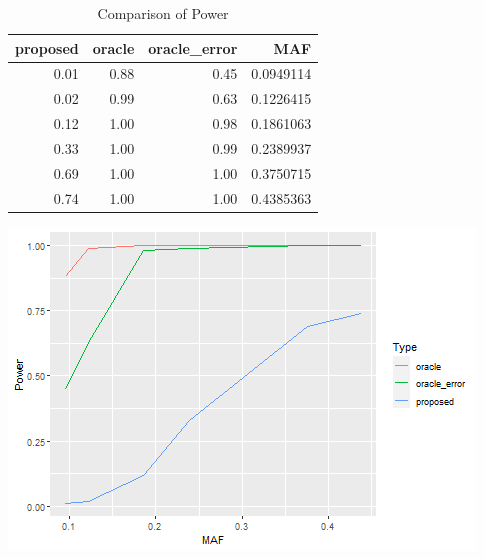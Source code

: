 \documentclass[
]{article}
\newenvironment{Shaded}{\begin{snugshade}}{\end{snugshade}}
\newcommand{\CommentTok}[1]{\textcolor[rgb]{0.56,0.35,0.01}{\textit{#1}}}
\newcommand{\DataTypeTok}[1]{\textcolor[rgb]{0.13,0.29,0.53}{#1}}
\newcommand{\KeywordTok}[1]{\textcolor[rgb]{0.13,0.29,0.53}{\textbf{#1}}}
\newcommand{\NormalTok}[1]{#1}
\newcommand{\OperatorTok}[1]{\textcolor[rgb]{0.81,0.36,0.00}{\textbf{#1}}}
\newcommand{\StringTok}[1]{\textcolor[rgb]{0.31,0.60,0.02}{#1}}
\begin{document}
\begin{table}

\caption{\label{tab:PowerComparison}Comparison of Power}
\centering
\begin{tabular}[t]{r|r|r|r}
\hline
proposed & oracle & oracle\_error & MAF\\
\hline
0.01 & 0.88 & 0.45 & 0.0949114\\
\hline
0.02 & 0.99 & 0.63 & 0.1226415\\
\hline
0.12 & 1.00 & 0.98 & 0.1861063\\
\hline
0.33 & 1.00 & 0.99 & 0.2389937\\
\hline
0.69 & 1.00 & 1.00 & 0.3750715\\
\hline
0.74 & 1.00 & 1.00 & 0.4385363\\
\hline
\end{tabular}
\end{table}

\begin{Shaded}
\end{Shaded}

\includegraphics{stats-gene-research-progress-v8_files/figure-latex/PowerComparison-1.png}
\end{document}
